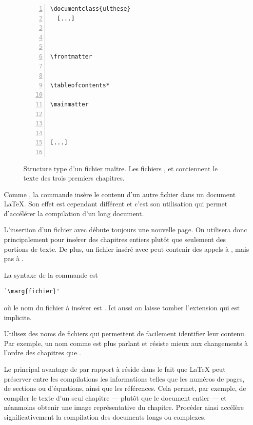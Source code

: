 \begin{figure}
  \centering
  \begin{minipage}{0.75\linewidth}
\begin{lstlisting}[numbers=left, numberstyle=\tiny,
                   frame=single, rulecolor=\color{black}, framesep=6pt]
\documentclass{ulthese}
  [...]



\frontmatter


\tableofcontents*

\mainmatter



[...]


\end{lstlisting}
  \end{minipage}
  \caption{Structure type d'un fichier maître. Les fichiers
    ,  et 
    contiennent le texte des trois premiers chapitres.}
  \label{fig:organisation:maitre}
\end{figure}

Comme \cmd{}, la commande \cmd{} insère le contenu
d'un autre fichier dans un document {\LaTeX}. Son effet est cependant
différent et c'est son utilisation qui permet d'accélérer la
compilation d'un long document.

L'insertion d'un fichier avec \cmd{} débute toujours une
nouvelle page. On utilisera donc \cmd{} principalement pour
insérer des chapitres entiers plutôt que seulement des portions de
texte. De plus, un fichier inséré avec \cmd{} peut contenir
des appels à \cmd{}, mais pas à \cmd{}.

La syntaxe de la commande \cmd{} est
\begin{lstlisting}
`\marg{fichier}'
\end{lstlisting}
où le nom du fichier à insérer est . Ici
aussi on laisse tomber l'extension  qui est implicite.


\begin{conseil}
  Utilisez des noms de fichiers qui permettent de facilement
  identifier leur contenu. Par exemple, un nom comme
   est plus parlant et résiste mieux aux
  changements à l'ordre des chapitres que .
\end{conseil}

Le principal avantage de \cmd{} par rapport à \cmd{}
réside dans le fait que {\LaTeX} peut préserver entre les compilations
les informations telles que les numéros de pages, de sections ou
d'équations, ainsi que les références. Cela permet, par exemple, de
compiler le texte d'un seul chapitre --- plutôt que le document entier
--- et néanmoins obtenir une image représentative du chapitre.
Procéder ainsi accélère significativement la compilation des documents
longs ou complexes.

